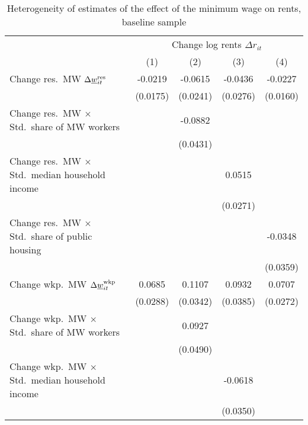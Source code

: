 \begin{table}[hbt!] \centering
    \caption{Heterogeneity of estimates of the effect of the minimum wage on rents, 
             baseline sample}
    \label{tab:heterogeneity}
    \begin{tabular}{@{}lcccc@{}}
        \toprule
            & \multicolumn{4}{c}{Change log rents $\Delta r_{it}$}                                                \\ \cmidrule(l){2-5} 
            & (1) & (2) & (3) & (4)                                                               \\ \midrule
        Change res.\ MW $\Delta\underline{w}_{it}^{\text{res}}$                &  -0.0219   &  -0.0615  &  -0.0436   &  -0.0227   \\
                                                               & (0.0175)  & (0.0241) & (0.0276)  & (0.0160)  \\
        Change res.\ MW $\times$ Std.\ share of MW workers     &        &  -0.0882  &        &        \\
                                                               &        & (0.0431) &        &        \\
        Change res.\ MW $\times$ Std.\ median household income &        &       &  0.0515   &        \\
                                                               &        &       & (0.0271)  &        \\
        Change res.\ MW $\times$ Std.\ share of public housing &        &       &        &  -0.0348   \\
                                                               &        &       &        & (0.0359)  \\
        Change wkp.\ MW $\Delta\underline{w}_{it}^{\text{wkp}}$                &  0.0685   &  0.1107  &  0.0932   &  0.0707   \\
                                                               & (0.0288)  & (0.0342) & (0.0385)  & (0.0272)  \\
        Change wkp.\ MW $\times$ Std.\ share of MW workers     &        &  0.0927  &        &        \\
                                                               &        & (0.0490) &        &        \\
        Change wkp.\ MW $\times$ Std.\ median household income &        &       &  -0.0618   &        \\
                                                               &        &       & (0.0350)  &        \\

\end{tabular}
\end{table}
